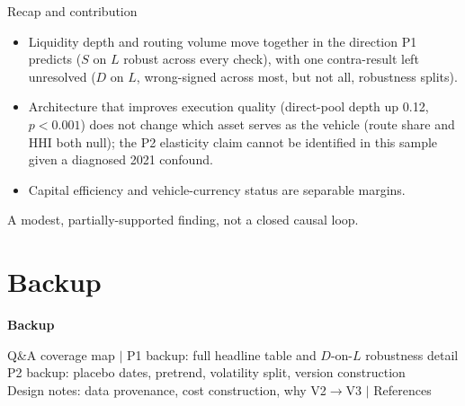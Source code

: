 \documentclass[aspectratio=169]{beamer}
\begin{document}
\begin{frame}{Recap and contribution}
  \begin{itemize}
    \item Liquidity depth and routing volume move together in the direction P1 predicts ($S$ on $L$ robust across every check), with one contra-result left unresolved ($D$ on $L$, wrong-signed across most, but not all, robustness splits).
    \item Architecture that improves execution quality (direct-pool depth up 0.12, $p<0.001$) does not change which asset serves as the vehicle (route share and HHI both null); the P2 elasticity claim cannot be identified in this sample given a diagnosed 2021 confound.
    \item Capital efficiency and vehicle-currency status are separable margins.
  \end{itemize}
  \vspace{0.8em}
  \begin{block}{}
    \centering A modest, partially-supported finding, not a closed causal loop.
  \end{block}
\end{frame}
\section{Backup}

\begin{frame}
  \centering
  \vfill
  {\Large \textbf{Backup}}
  \vspace{1em}

  {\small
  Q\&A coverage map \quad $\vert$ \quad P1 backup: full headline table and $D$-on-$L$ robustness detail \\
  P2 backup: placebo dates, pretrend, volatility split, version construction \\
  Design notes: data provenance, cost construction, why V2$\to$V3 \quad $\vert$ \quad References
  }
  \vfill
\end{frame}
\end{document}

